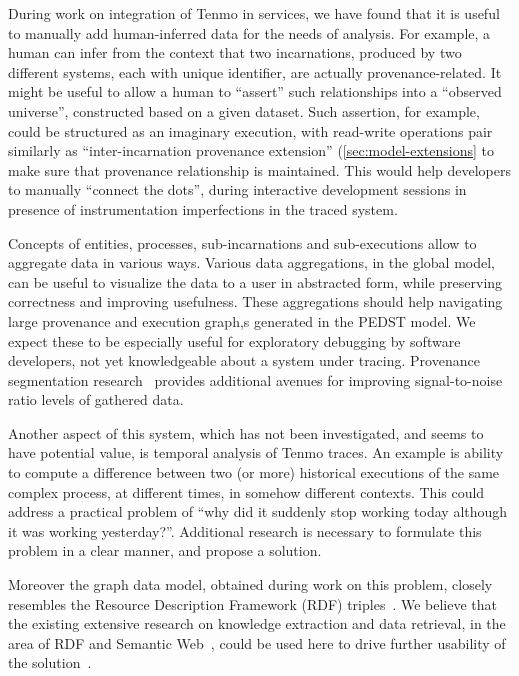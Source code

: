 During work on integration of Tenmo in services, we have found that it is useful to manually add human-inferred data for the needs of analysis. For example, a human can infer from the context that two incarnations, produced by two different systems, each with unique identifier, are actually provenance-related. It might be useful to allow a human to ``assert'' such relationships into a ``observed universe'', constructed based on a given dataset. Such assertion, for example, could be structured as an imaginary execution, with read-write operations pair similarly as ``inter-incarnation provenance extension'' (\cref{sec:model-extensions} to make sure that provenance relationship is maintained. This would help developers to manually ``connect the dots'', during interactive development sessions in presence of instrumentation imperfections in the traced system.

Concepts of entities, processes, sub-incarnations and sub-executions allow to aggregate data in various ways. Various data aggregations, in the global model, can be useful to visualize the data to a user in abstracted form, while preserving correctness and improving usefulness. These aggregations should help navigating large provenance and execution graph,s generated in the PEDST model. We expect these to be especially useful for exploratory debugging by software developers, not yet knowledgeable about a system under tracing. Provenance segmentation research~\cite{provenance-segmentation-abreu2016} provides additional avenues for improving signal-to-noise ratio levels of gathered data.

Another aspect of this system, which has not been investigated, and seems to have potential value, is temporal analysis of Tenmo traces. An example is ability to compute a difference between two (or more) historical executions of the same complex process, at different times, in somehow different contexts. This could address a practical problem of ``why did it suddenly stop working today although it was working yesterday?''. Additional research is necessary to formulate this problem in a clear manner, and propose a solution.

Moreover the graph data model, obtained during work on this problem, closely resembles the Resource Description Framework (RDF) triples~\cite{rdf-auer2007dbpedia}. We believe that the existing extensive research on knowledge extraction and data retrieval, in the area of RDF and Semantic Web~\cite{rdf-shadbolt2006semantic}, could be used here to drive further usability of the solution~\cite{rdf-powers2003practical}.

